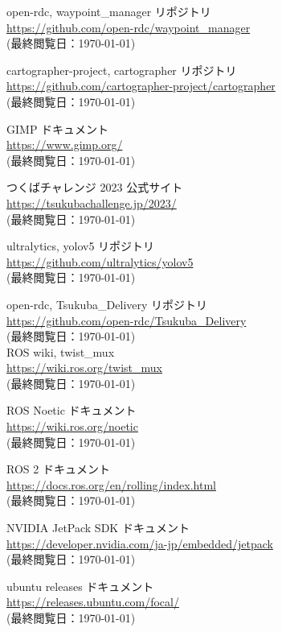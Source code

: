\documentclass[twocolumn, 9pt]{jsproceedings}
\begin{document}
\begin{thebibliography}{99}
open-rdc, waypoint\_manager リポジトリ\\
\url{https://github.com/open-rdc/waypoint_manager}\\
(最終閲覧日：\today)

cartographer-project, cartographer リポジトリ\\
\url{https://github.com/cartographer-project/cartographer}\\
(最終閲覧日：\today)

GIMP ドキュメント\\
\url{https://www.gimp.org/}\\
(最終閲覧日：\today)

つくばチャレンジ 2023 公式サイト\\
\url{https://tsukubachallenge.jp/2023/}\\
(最終閲覧日：\today)

ultralytics, yolov5 リポジトリ\\
\url{https://github.com/ultralytics/yolov5}\\
(最終閲覧日：\today)

open-rdc, Tsukuba\_Delivery リポジトリ\\
\url{https://github.com/open-rdc/Tsukuba_Delivery}\\
(最終閲覧日：\today)\\

ROS wiki, twist\_mux\\
\url{https://wiki.ros.org/twist_mux}\\
(最終閲覧日：\today)

ROS Noetic ドキュメント\\
\url{https://wiki.ros.org/noetic}\\
(最終閲覧日：\today)

ROS 2 ドキュメント\\
\url{https://docs.ros.org/en/rolling/index.html}\\
(最終閲覧日：\today)

NVIDIA JetPack SDK ドキュメント\\
\url{https://developer.nvidia.com/ja-jp/embedded/jetpack}\\
(最終閲覧日：\today)

ubuntu releases ドキュメント\\
\url{https://releases.ubuntu.com/focal/}\\
(最終閲覧日：\today)


\end{thebibliography}
\end{document}
